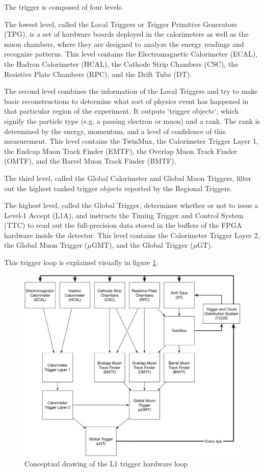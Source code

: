 The trigger is composed of four levels.

The lowest level, called the Local Triggers or Trigger Primitive Generators (TPG),
is a set of hardware boards deployed in the calorimeters as well as the
muon chambers, where they are designed to analyze the energy readings and
recognize patterns.
This level contains the Electromagnetic Calorimeter (ECAL), the
Hadron Calorimeter (HCAL), the Cathode Strip Chambers (CSC), the
Resistive Plate Chambers (RPC), and the Drift Tube (DT).

The second level combines the information of the
Local Triggers and try to make basic reconstructions to determine what sort of
physics event has happened in that particular region of the experiment.
It outputs `trigger objects`, which signify the particle type (e.g. a passing electron or
muon) and a rank. The rank is determined by the energy, momentum, and a level of
confidence of this measurement.
This level contains the TwinMux, the Calorimeter Trigger Layer 1, the
Endcap Muon Track Finder (EMTF), the Overlap Muon Track Finder (OMTF), and the
Barrel Muon Track Finder (BMTF).

The third level, called the Global Calorimeter and Global Muon Triggers, filter
out the highest ranked trigger objects reported by the Regional Triggers.

The highest level, called the Global Trigger, determines whether or not to issue
a Level-1 Accept (L1A), and instructs the Timing Trigger and Control System (TTC)
to read out the full-precision data stored in the buffers of the FPGA hardware
inside the detector.
This level contains the Calorimeter Trigger Layer 2, the Global Muon Trigger ($\mu$GMT),
and the Global Trigger ($\mu$GT).

This trigger loop is explained visually in figure \ref{fig:l1triggerloop}.

\begin{figure}
  \includegraphics[width=\textwidth]{images/L1-trigger-loop}
  \caption{Conceptual drawing of the L1 trigger hardware loop}
  \label{fig:l1triggerloop}
\end{figure}

